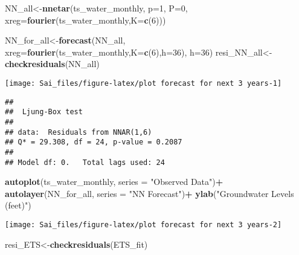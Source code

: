 \documentclass[
]{article}
\newenvironment{Shaded}{\begin{snugshade}}{\end{snugshade}}
\newcommand{\AttributeTok}[1]{\textcolor[rgb]{0.13,0.29,0.53}{#1}}
\newcommand{\DecValTok}[1]{\textcolor[rgb]{0.00,0.00,0.81}{#1}}
\newcommand{\FunctionTok}[1]{\textcolor[rgb]{0.13,0.29,0.53}{\textbf{#1}}}
\newcommand{\NormalTok}[1]{#1}
\newcommand{\OtherTok}[1]{\textcolor[rgb]{0.56,0.35,0.01}{#1}}
\newcommand{\SpecialCharTok}[1]{\textcolor[rgb]{0.81,0.36,0.00}{\textbf{#1}}}
\newcommand{\StringTok}[1]{\textcolor[rgb]{0.31,0.60,0.02}{#1}}
\begin{document}
\begin{Shaded}
\begin{Highlighting}[]
\NormalTok{NN\_all}\OtherTok{\textless{}{-}}\FunctionTok{nnetar}\NormalTok{(ts\_water\_monthly,}
                 \AttributeTok{p=}\DecValTok{1}\NormalTok{,}
                 \AttributeTok{P=}\DecValTok{0}\NormalTok{,}
                 \AttributeTok{xreg=}\FunctionTok{fourier}\NormalTok{(ts\_water\_monthly,}\AttributeTok{K=}\FunctionTok{c}\NormalTok{(}\DecValTok{6}\NormalTok{)))}

\NormalTok{NN\_for\_all}\OtherTok{\textless{}{-}}\FunctionTok{forecast}\NormalTok{(NN\_all,}
                        \AttributeTok{xreg=}\FunctionTok{fourier}\NormalTok{(ts\_water\_monthly,}\AttributeTok{K=}\FunctionTok{c}\NormalTok{(}\DecValTok{6}\NormalTok{),}\AttributeTok{h=}\DecValTok{36}\NormalTok{), }
                        \AttributeTok{h=}\DecValTok{36}\NormalTok{)}
\NormalTok{resi\_NN\_all}\OtherTok{\textless{}{-}}\FunctionTok{checkresiduals}\NormalTok{(NN\_all)}
\end{Highlighting}
\end{Shaded}

\begin{center}\texttt{[image: Sai\_files/figure-latex/plot forecast for next 3 years-1]} \end{center}

\begin{verbatim}
## 
##  Ljung-Box test
## 
## data:  Residuals from NNAR(1,6)
## Q* = 29.308, df = 24, p-value = 0.2087
## 
## Model df: 0.   Total lags used: 24
\end{verbatim}

\begin{Shaded}
\begin{Highlighting}[]
\FunctionTok{autoplot}\NormalTok{(ts\_water\_monthly, }\AttributeTok{series =} \StringTok{"Observed Data"}\NormalTok{)}\SpecialCharTok{+}
  \FunctionTok{autolayer}\NormalTok{(NN\_for\_all, }\AttributeTok{series =} \StringTok{"NN Forecast"}\NormalTok{)}\SpecialCharTok{+}
  \FunctionTok{ylab}\NormalTok{(}\StringTok{"Groundwater Levels (feet)"}\NormalTok{)}
\end{Highlighting}
\end{Shaded}

\begin{center}\texttt{[image: Sai\_files/figure-latex/plot forecast for next 3 years-2]} \end{center}

\begin{Shaded}
\begin{Highlighting}[]
\NormalTok{resi\_ETS}\OtherTok{\textless{}{-}}\FunctionTok{checkresiduals}\NormalTok{(ETS\_fit)}
\end{Highlighting}
\end{Shaded}
\end{document}

